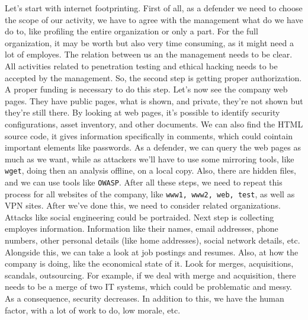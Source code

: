 Let's start with internet footprinting. First of all, as 
a defender we need to choose the scope of our activity, we 
have to agree with the management what do we have do to, 
like profiling the entire organization or only a part. 
For the full organization, it may be worth but also very 
time consuming, as it might need a lot of employes. 
The relation between us an the management needs to be clear. 
All activities related to penetration testing and ethical 
hacking needs to be accepted by the management. \newline 
So, the second step is getting proper authorization. A 
proper funding is necessary to do this step. \newline 
\newline Let's now see the company web pages. They have public pages, 
what is shown, and private, they're not shown but they're 
still there. By looking at web pages, it's possible to 
identify security configurations, asset inventory, and 
other documents. We can also find the HTML source code, 
it gives information specifically in comments, which could 
cointain important elements like passwords. As a defender, 
we can query the web pages as much as we want, while as
attackers we'll have to use some mirroring tools, like 
\texttt{wget}, doing then an analysis offline, on a local
copy. Also, there are hidden files, and we can use 
tools like \texttt{OWASP}. After all these steps, we need 
to repeat this process for all websites of the company, like
\texttt{www1, www2, web, test}, as well as VPN sites. \newline 
After we've done this, we need to consider related 
organizations. Attacks like social engineering could 
be portraided. \newline
\newline Next step is collecting employes information. Information 
like their names, email addresses, phone numbers, other 
personal details (like home addresses), social network 
details, etc. \newline
\newline Alongside this, we can take a look at job 
postings and resumes. Also, at how the company is doing, 
like the economical state of it. Look for merges, acquisitions, 
scandals, outsourcing. For example, if we deal with merge 
and acquisition, there needs to be a merge of two IT 
systems, which could be problematic and messy. As a consequence, 
security decreases. In addition to this, we have the 
human factor, with a lot of work to do, low morale, etc. \newline

